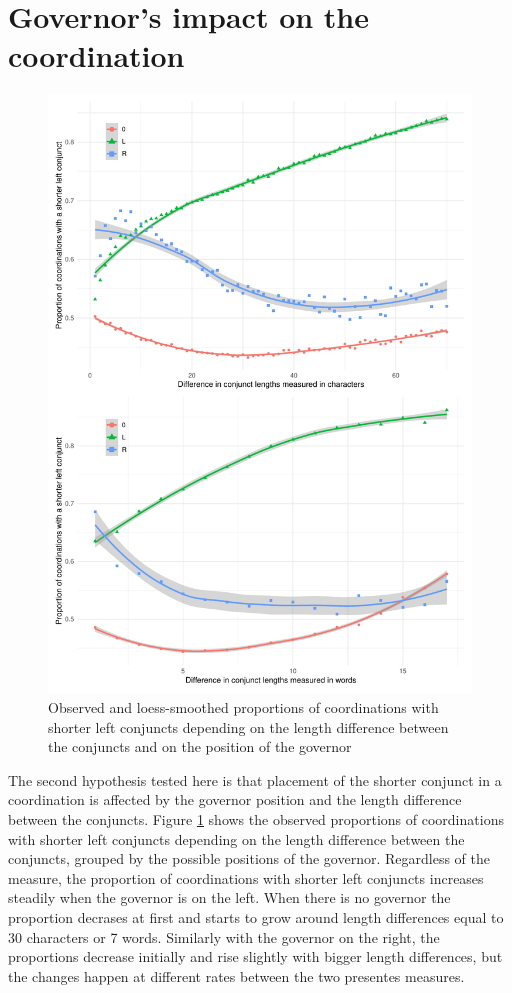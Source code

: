 \section{Governor's impact on the coordination}
\begin{figure}[hbt!]
    \includegraphics[width=\textwidth]{inputs/observed.pdf}
    \caption{\centering Observed and loess-smoothed proportions of coordinations with shorter left conjuncts depending on the length difference between the conjuncts and on the position of the governor}\label{fig:observed}
\end{figure}

The second hypothesis tested here is that placement of the shorter conjunct in a coordination is affected by the governor position and the length difference between the conjuncts. Figure \ref{fig:observed} shows the observed proportions of coordinations with shorter left conjuncts depending on the length difference between the conjuncts, grouped by the possible positions of the governor. Regardless of the measure, the proportion of coordinations with shorter left conjuncts increases steadily when the governor is on the left. When there is no governor the proportion decrases at first and starts to grow around length differences equal to 30 characters or 7 words. Similarly with the governor on the right, the proportions decrease initially and rise slightly with bigger length differences, but the changes happen at different rates between the two presentes measures.

